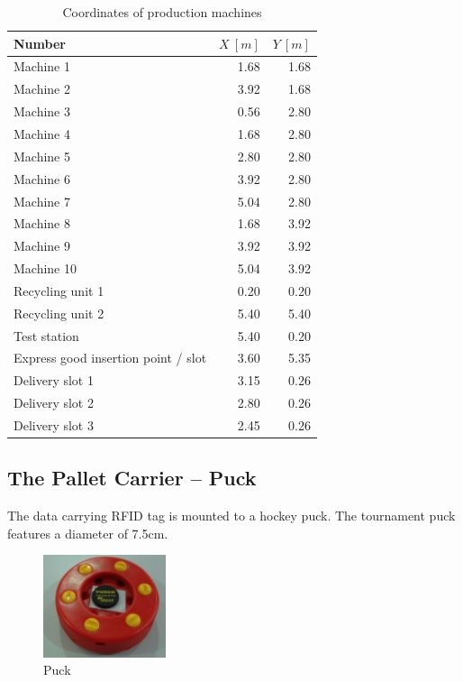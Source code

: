 \documentclass[12pt,twoside]{article}
\begin{document}
\begin{table}[h]
  \centering
  \begin{tabular}{l|r|r}
    \multicolumn{1}{l}{Number} & \multicolumn{1}{l}{$X~[m]$} & \multicolumn{1}{l}{$Y~[m]$}\\ \hline
    Machine 1 & 1.68 & 1.68 \\
    Machine 2 & 3.92 & 1.68 \\
    Machine 3 & 0.56 & 2.80 \\
    Machine 4 & 1.68 & 2.80 \\
    Machine 5 & 2.80 & 2.80 \\
    Machine 6 & 3.92 & 2.80 \\
    Machine 7 & 5.04 & 2.80 \\
    Machine 8 & 1.68 & 3.92 \\
    Machine 9 & 3.92 & 3.92 \\
    Machine 10 & 5.04 & 3.92 \\
    Recycling unit 1 & 0.20 & 0.20 \\
    Recycling unit 2 & 5.40 & 5.40 \\
    Test station &	5.40  &0.20 \\
    Express good insertion point / slot & 	3.60 & 	5.35 \\
    Delivery slot 1 & 	3.15 & 0.26 \\
    Delivery slot 2 &	2.80 & 0.26 \\ 
    Delivery slot 3 &	2.45 & 0.26 \\\hline
  \end{tabular}

  \caption{Coordinates of production machines}
  \label{tab:coordinates}
\end{table}

\subsection{The Pallet Carrier – Puck}
The data carrying RFID tag is mounted to a hockey puck. The tournament
puck features a diameter of 7.5cm.

\begin{figure}[h!]
  \centering
  \includegraphics[height=3cm]{125px-Puck}
  \caption{Puck}
  \label{fig:puck}
\end{figure}
\end{document}
